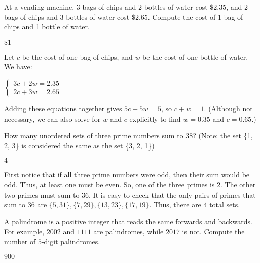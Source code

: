 \documentclass[11pt]{article}
\begin{document}
\begin{problem}
At a vending machine, 3 bags of chips and 2 bottles of water cost $\$2.35$, and 2 bags of chips and 3 bottles of water cost $\$2.65$. Compute the cost of 1 bag of chips and 1 bottle of water.
\end{problem}

\begin{answer}
$\boxed{\$1}$
\end{answer}

\begin{solution}
Let $c$ be the cost of one bag of chips, and $w$ be the cost of one bottle of water. We have: \begin{center}$\begin{cases} 3c + 2w = 2.35 \\ 2c + 3w = 2.65 \end{cases}$\end{center} Adding these equations together gives $5c + 5w = 5$, so $c + w = \boxed{1}$. (Although not necessary, we can also solve for $w$ and $c$ explicitly to find $w = 0.35$ and $c = 0.65$.)
\end{solution}

\begin{problem}
How many unordered sets of three prime numbers sum to $38$? (Note: the set \{1, 2, 3\} is considered the same as the set \{3, 2, 1\})
\end{problem}

\begin{answer}
$\boxed{4}$
\end{answer}

\begin{solution}
First notice that if all three prime numbers were odd, then their sum would be odd. Thus, at least one must be even. So, one of the three primes is $2$. The other two primes must sum to $36$. It is easy to check that the only pairs of primes that sum to $36$ are $\{5, 31\}, \{7, 29\}, \{13, 23\}, \{17, 19\}$. Thus, there are $\boxed{4}$ total sets.
\end{solution}

\begin{problem}
A palindrome is a positive integer that reads the same forwards and backwards. For example, $2002$ and $1111$ are palindromes, while $2017$ is not. Compute the number of $5$-digit palindromes.
\end{problem}

\begin{answer}
$\boxed{900}$
\end{answer}
\end{document}
